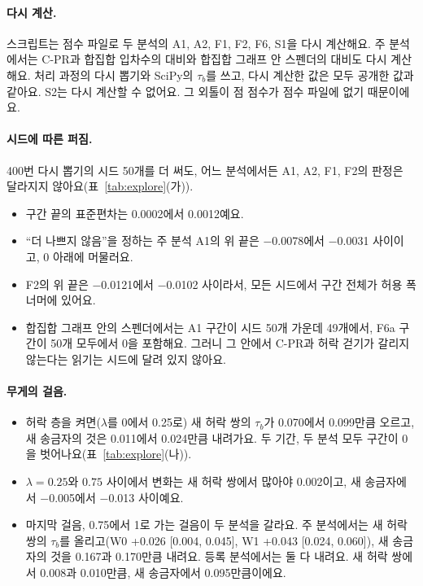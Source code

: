 \paragraph{다시 계산.}
스크립트는 점수 파일로 두 분석의 A1, A2, F1, F2, F6, S1을 다시 계산해요. 주 분석에서는 C-PR과 합집합 입차수의 대비와 합집합 그래프 안 스펜더의 대비도 다시 계산해요. 처리 과정의 다시 뽑기와 SciPy의 $\tau_b$를 쓰고, 다시 계산한 값은 모두 공개한 값과 같아요. S2는 다시 계산할 수 없어요. 그 외톨이 점 점수가 점수 파일에 없기 때문이에요.

\paragraph{시드에 따른 퍼짐.}
400번 다시 뽑기의 시드 50개를 더 써도, 어느 분석에서든 A1, A2, F1, F2의 판정은 달라지지 않아요(표~\ref{tab:explore}(가)).
\begin{itemize}
\item 구간 끝의 표준편차는 0.0002에서 0.0012예요.
\item “더 나쁘지 않음”을 정하는 주 분석 A1의 위 끝은 −0.0078에서 −0.0031 사이이고, 0 아래에 머물러요.
\item F2의 위 끝은 −0.0121에서 −0.0102 사이라서, 모든 시드에서 구간 전체가 허용 폭 너머에 있어요.
\item 합집합 그래프 안의 스펜더에서는 A1 구간이 시드 50개 가운데 49개에서, F6a 구간이 50개 모두에서 0을 포함해요. 그러니 그 안에서 C-PR과 허락 걷기가 갈리지 않는다는 읽기는 시드에 달려 있지 않아요.
\end{itemize}

\paragraph{무게의 걸음.}
\begin{itemize}
\item 허락 층을 켜면($\lambda$를 0에서 0.25로) 새 허락 쌍의 $\tau_b$가 0.070에서 0.099만큼 오르고, 새 송금자의 것은 0.011에서 0.024만큼 내려가요. 두 기간, 두 분석 모두 구간이 0을 벗어나요(표~\ref{tab:explore}(나)).
\item $\lambda=0.25$와 $0.75$ 사이에서 변화는 새 허락 쌍에서 많아야 0.002이고, 새 송금자에서 −0.005에서 −0.013 사이예요.
\item 마지막 걸음, 0.75에서 1로 가는 걸음이 두 분석을 갈라요. 주 분석에서는 새 허락 쌍의 $\tau_b$를 올리고(W0 +0.026 [0.004, 0.045], W1 +0.043 [0.024, 0.060]), 새 송금자의 것을 0.167과 0.170만큼 내려요. 등록 분석에서는 둘 다 내려요. 새 허락 쌍에서 0.008과 0.010만큼, 새 송금자에서 0.095만큼이에요.
\end{itemize}

